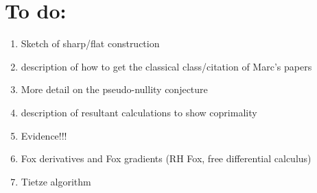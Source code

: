 \documentclass[a4paper,11pt]{article}
\numberwithin{equation}{section}
\begin{document}
\section*{To do:}

\begin{enumerate}\setlength{\itemsep}{-2pt}
    \item Sketch of sharp/flat construction
    \item description of how to get the classical class/citation of Marc's papers
    \item More detail on the pseudo-nullity conjecture
    \item description of resultant calculations to show coprimality
    \item Evidence!!!
    \item Fox derivatives and Fox gradients (RH Fox, free differential calculus)
    \item Tietze algorithm
\end{enumerate}

\footnotesize
\renewcommand{\refname}{\normalsize References}
{}


\Addresses
\end{document}
